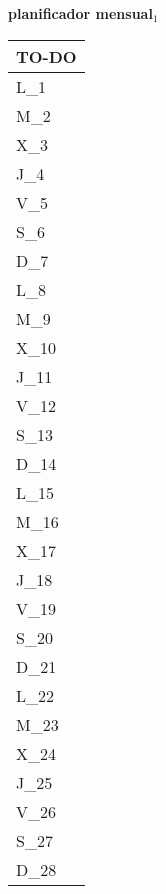 \clearpage
\raggedright{
	\fontsize{25}{50}\selectfont
	\textbf{\NextYear}
}\scriptsize{\textbf{planificador mensual$_1$}}\\[11.3pt]



	\noindent\dotfill
	\renewcommand{\arraystretch}{1.5}\scriptsize
		\begin{longtabu} to \textwidth { X[l]}
		\centering \small{\textbf{TO-DO}} \\
		\toprule
		L_{1} \dotfill\\
		M_{2} \dotfill\\
		X_{3} \dotfill\\
		J_{4} \dotfill\\
		V_{5} \dotfill\\
		S_{6} \dotfill\\
		D_{7} \dotfill\\
		\hline
		L_{8} \dotfill\\
		M_{9} \dotfill\\
		X_{10} \dotfill\\
		J_{11} \dotfill\\
		V_{12} \dotfill\\
		S_{13} \dotfill\\
		D_{14} \dotfill\\
		\hline
		L_{15} \dotfill\\
		M_{16} \dotfill\\
		X_{17} \dotfill\\
		J_{18} \dotfill\\
		V_{19} \dotfill\\
		S_{20} \dotfill\\
		D_{21} \dotfill\\
		\hline
		L_{22} \dotfill\\
		M_{23} \dotfill\\
		X_{24} \dotfill\\
		J_{25} \dotfill\\
		V_{26} \dotfill\\
		S_{27} \dotfill\\
		D_{28} \dotfill\\

		\bottomrule

	\end{longtabu}


\clearpage

